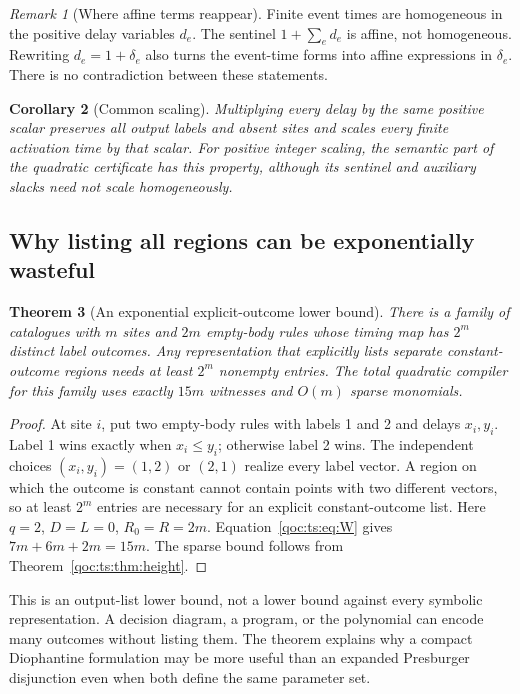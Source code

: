 \documentclass[11pt,letterpaper]{article}
\newtheorem{theorem}{Theorem}[section]
\newtheorem{corollary}[theorem]{Corollary}
\theoremstyle{definition}
\theoremstyle{remark}
\newtheorem{remark}[theorem]{Remark}
\begin{document}
\begin{remark}[Where affine terms reappear]
Finite event times are homogeneous in the positive delay variables $d_e$.
The sentinel $1+\sum_e d_e$ is affine, not homogeneous. Rewriting
$d_e=1+\delta_e$ also turns the event-time forms into affine expressions
in $\delta_e$. There is no contradiction between these statements.
\end{remark}

\begin{corollary}[Common scaling]
Multiplying every delay by the same positive scalar preserves all output
labels and absent sites and scales every finite activation time by that
scalar. For positive integer scaling, the semantic part of the quadratic
certificate has this property, although its sentinel and auxiliary slacks
need not scale homogeneously.
\end{corollary}

\subsection{Why listing all regions can be exponentially wasteful}
\begin{theorem}[An exponential explicit-outcome lower bound]\label{qoc:ts:thm:exp}
There is a family of catalogues with $m$ sites and $2m$ empty-body rules
whose timing map has $2^m$ distinct label outcomes. Any representation
that explicitly lists separate constant-outcome regions needs at least
$2^m$ nonempty entries. The total quadratic compiler for this family uses
exactly $15m$ witnesses and $O(m)$ sparse monomials.
\end{theorem}
\begin{proof}
At site $i$, put two empty-body rules with labels 1 and 2 and delays
$x_i,y_i$. Label 1 wins exactly when $x_i\le y_i$; otherwise label 2 wins.
The independent choices $(x_i,y_i)=(1,2)$ or $(2,1)$ realize every label
vector. A region on which the outcome is constant cannot contain points
with two different vectors, so at least $2^m$ entries are necessary for
an explicit constant-outcome list. Here $q=2$, $D=L=0$, $R_0=R=2m$.
Equation~\eqref{qoc:ts:eq:W} gives $7m+6m+2m=15m$. The sparse bound follows
from Theorem~\ref{qoc:ts:thm:height}.
\end{proof}

This is an output-list lower bound, not a lower bound against every
symbolic representation. A decision diagram, a program, or the polynomial
can encode many outcomes without listing them. The theorem explains why
a compact Diophantine formulation may be more useful than an expanded
Presburger disjunction even when both define the same parameter set.
\end{document}
